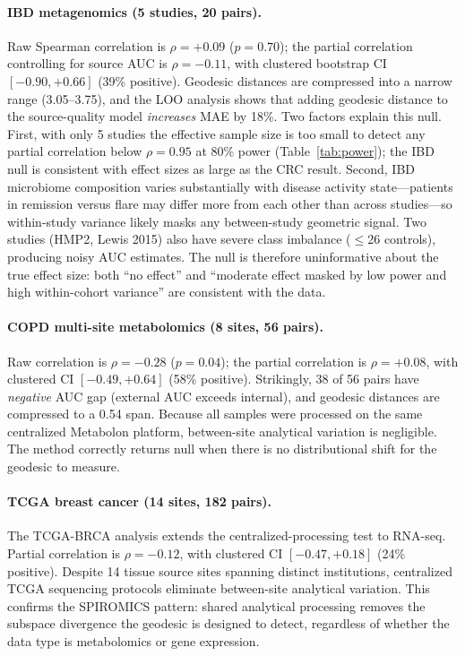 \documentclass{article}
\begin{document}
\paragraph{IBD metagenomics (5 studies, 20 pairs).} Raw Spearman correlation is $\rho = +0.09$ ($p = 0.70$); the partial correlation controlling for source AUC is $\rho = -0.11$, with clustered bootstrap CI $[-0.90, +0.66]$ (39\% positive). Geodesic distances are compressed into a narrow range (3.05--3.75), and the LOO analysis shows that adding geodesic distance to the source-quality model \emph{increases} MAE by 18\%. Two factors explain this null. First, with only 5 studies the effective sample size is too small to detect any partial correlation below $\rho = 0.95$ at 80\% power (Table~\ref{tab:power}); the IBD null is consistent with effect sizes as large as the CRC result. Second, IBD microbiome composition varies substantially with disease activity state---patients in remission versus flare may differ more from each other than across studies---so within-study variance likely masks any between-study geometric signal. Two studies (HMP2, Lewis 2015) also have severe class imbalance ($\leq$26 controls), producing noisy AUC estimates. The null is therefore uninformative about the true effect size: both ``no effect'' and ``moderate effect masked by low power and high within-cohort variance'' are consistent with the data.

\paragraph{COPD multi-site metabolomics (8 sites, 56 pairs).} Raw correlation is $\rho = -0.28$ ($p = 0.04$); the partial correlation is $\rho = +0.08$, with clustered CI $[-0.49, +0.64]$ (58\% positive). Strikingly, 38 of 56 pairs have \emph{negative} AUC gap (external AUC exceeds internal), and geodesic distances are compressed to a 0.54 span. Because all samples were processed on the same centralized Metabolon platform, between-site analytical variation is negligible. The method correctly returns null when there is no distributional shift for the geodesic to measure.

\paragraph{TCGA breast cancer (14 sites, 182 pairs).} The TCGA-BRCA analysis extends the centralized-processing test to RNA-seq. Partial correlation is $\rho = -0.12$, with clustered CI $[-0.47, +0.18]$ (24\% positive). Despite 14 tissue source sites spanning distinct institutions, centralized TCGA sequencing protocols eliminate between-site analytical variation. This confirms the SPIROMICS pattern: shared analytical processing removes the subspace divergence the geodesic is designed to detect, regardless of whether the data type is metabolomics or gene expression.
\end{document}
